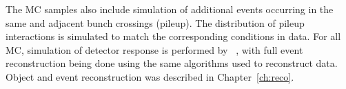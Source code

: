 The MC samples also include simulation of additional events occurring in the same and adjacent bunch crossings (pileup). The distribution of pileup interactions is simulated to match the corresponding conditions in data. For all MC, simulation of detector response is performed by \GEANTfour~\cite{Agostinelli:2002hh}, with full event reconstruction being done using the same algorithms used to reconstruct data. Object and event reconstruction was described in Chapter~\ref{ch:reco}. 






